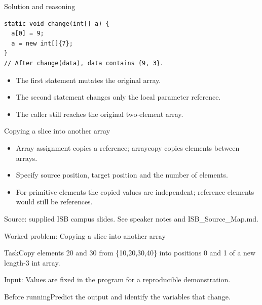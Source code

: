\documentclass[10pt,aspectratio=169]{beamer}
\begin{document}
\begin{frame}[fragile,t]{Solution and reasoning}
\begin{lstlisting}
static void change(int[] a) {
  a[0] = 9;
  a = new int[]{7};
}
// After change(data), data contains {9, 3}.
\end{lstlisting}\vspace{1mm}\small\begin{itemize}
\item The first statement mutates the original array.
\item The second statement changes only the local parameter reference.
\item The caller still reaches the original two-element array.
\end{itemize}
\end{frame}

\begin{frame}[fragile,t]{Copying a slice into another array}
\begin{itemize}
\item Array assignment copies a reference; arraycopy copies elements between arrays.
\item Specify source position, target position and the number of elements.
\item For primitive elements the copied values are independent; reference elements would still be references.
\end{itemize}
\vspace{3mm}\footnotesize\textcolor{accent}{Source: supplied ISB campus slides. See speaker notes and ISB\_Source\_Map.md.}
\end{frame}

\begin{frame}[fragile,t]{Worked problem: Copying a slice into another array}
\begin{block}{Task}Copy elements 20 and 30 from \{10,20,30,40\} into positions 0 and 1 of a new length{-}3 int array.\end{block}
\small Input: Values are fixed in the program for a reproducible demonstration.\par\vspace{3mm}\begin{exampleblock}{Before running}Predict the output and identify the variables that change.\end{exampleblock}
\end{frame}
\end{document}

